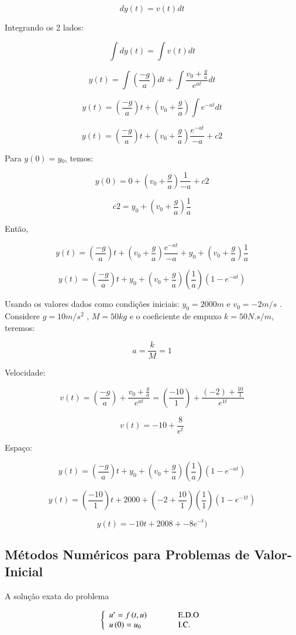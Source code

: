 \begin{example}
$$dy(t)=v(t)dt$$

Integrando os 2 lados:

$$\int dy(t)=\int v(t)dt$$

$$y(t)=\int(\frac{-g}{a})dt+\int\frac{v_{0}+\frac{g}{a}}{e^{at}}dt$$

$$y(t)=(\frac{-g}{a})t+(v_{0}+\frac{g}{a})\int e^{-at}dt$$

$$y(t)=(\frac{-g}{a})t+(v_{0}+\frac{g}{a})\frac{e^{-at}}{-a}+c2$$

Para $y(0)=y{}_{0}$, temos:

$$y(0)=0+(v_{0}+\frac{g}{a})\frac{1}{-a}+c2$$

$$c2=y_{0}+(v_{0}+\frac{g}{a})\frac{1}{a}$$

Então,

$$y(t)=(\frac{-g}{a})t+(v_{0}+\frac{g}{a})\frac{e^{-at}}{-a}+y_{0}+(v_{0}+\frac{g}{a})\frac{1}{a}$$

$$y(t)=(\frac{-g}{a})t+y_{0}+(v_{0}+\frac{g}{a})(\frac{1}{a})(1-e^{-at})$$

Usando os valores dados como condições iniciais: $y_{0}=2000m$ e $v_{0}=-2m/s$ . Considere $g=10m/s^{2}$ , $M = 50 kg$ e o coeficiente de empuxo $k = 50 N.s/m$, teremos:

$$a=\frac{k}{M}=1$$

Velocidade:

$$v(t)=(\frac{-g}{a})+\frac{v_{0}+\frac{g}{a}}{e^{at}}=(\frac{-10}{1})+\frac{(-2)+\frac{10}{1}}{e^{1t}}$$

$$v(t)=-10+\frac{8}{e^{t}}$$

Espaço:

$$y(t)=(\frac{-g}{a})t+y_{0}+(v_{0}+\frac{g}{a})(\frac{1}{a})(1-e^{-at})$$

$$y(t)=(\frac{-10}{1})t+2000+(-2+\frac{10}{1})(\frac{1}{1})(1-e^{-1t})$$

$$y(t)=-10t+2008+-8e^{-t})$$
\end{example}


\subsection{Métodos Numéricos para Problemas de Valor-Inicial}

A solução exata do problema

\[
 \left\{
  \begin{array}{ll}
   u' = f \, (t, u) & \hspace*{1cm} \mbox{E.D.O} \\
   u \, (0) = u_0 & \hspace*{1cm} \mbox{I.C.}
  \end{array}
 \right.
\]

